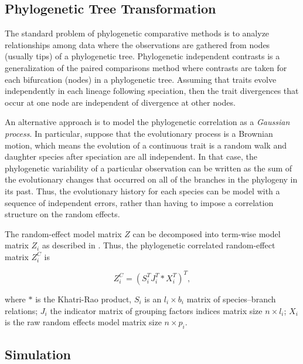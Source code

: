 \subsection{Phylogenetic Tree Transformation}
The standard problem of phylogenetic comparative methods is to analyze relationships among data where the observations are gathered from nodes (usually tips) of a phylogenetic tree.
Phylogenetic independent contrasts is a generalization of the paired comparisons method where contrasts are taken for each bifurcation (nodes) in a phylogenetic tree. 
Assuming that traits evolve independently in each lineage following speciation, then the trait divergences that occur at one node are independent of divergence at other nodes.  

An alternative approach is to model the phylogenetic correlation as a \textit{Gaussian process}. 
In particular, suppose that the evolutionary process is a Brownian motion, which means the evolution of a continuous trait is a random walk and daughter species after speciation are all independent.  
In that case, the phylogenetic variability of a particular observation can be written as the sum of the evolutionary changes that occurred on all of the branches in the phylogeny in its past. 
Thus, the evolutionary history for each species can be model with a sequence of independent errors, rather than having to impose a correlation structure on the random effects. 

The random-effect model matrix $Z$ can be decomposed into term-wise model matrix $Z_{i}$ as described in .
Thus, the phylogenetic correlated random-effect matrix $Z^{C}_{i}$ is

\begin{equation}
Z^{C}_{i} = (S^{T}_{i}J^{T}_{i} \ast X^{T}_{i})^{T},
\end{equation}


where $\ast$ is the Khatri-Rao product, $S_{i}$ is an $l_{i} \times b_{i}$ matrix of species--branch relations; $J_{i}$ the indicator matrix of grouping factors indices matrix size $n \times l_{i}$; $X_{i}$ is the raw random effects model matrix size $n \times p_{i}$.



\subsection{Simulation}

